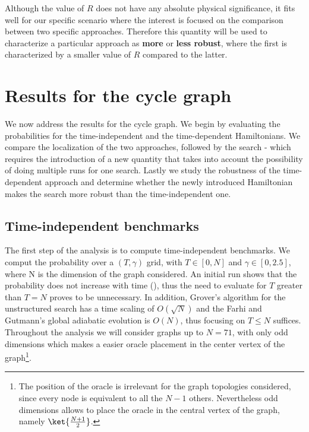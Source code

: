         Although the value of $R$ does not have any absolute physical significance, it fits well for our specific scenario where the interest is focused on the comparison between two specific approaches. Therefore this quantity will be used to characterize a particular approach as \textbf{more} or \textbf{less robust}, where the first is characterized by a smaller value of $R$ compared to the latter.

\clearpage
\section{Results for the cycle graph}
We now address the results for the cycle graph. We begin by evaluating the probabilities for the time-independent and the time-dependent Hamiltonians. We compare the localization of the two approaches, followed by the search - which requires the introduction of a new quantity that takes into account the possibility of doing multiple runs for one search. Lastly we study the robustness of the time-dependent approach and determine whether the newly introduced Hamiltonian makes the search more robust than the time-independent one.
    \subsection{Time-independent benchmarks}
        The first step of the analysis is to compute time-independent benchmarks. We comput the probability over a $(T,\gamma)$ grid, with $T\in[0,N]$ and $\gamma\in[0,2.5]$, where N is the dimension of the graph considered. An initial run shows that the probability does not increase with time (), thus the need to evaluate for $T$ greater than $T=N$ proves to be unnecessary. In addition, Grover's algorithm for the unstructured search has a time scaling of $O(\sqrt{N})$ and the Farhi and Gutmann's global adiabatic evolution is $O(N)$, thus focusing on $T \leq N$ suffices.\\
        

        \clearpage
        \noindent
        Throughout the analysis we will consider graphs up to $N = 71$, with only odd dimensions which makes a easier oracle placement in the center vertex of the graph\footnote{The position of the oracle is irrelevant for the graph topologies considered, since every node is equivalent to all the $N-1$ others. Nevertheless odd dimensions allows to place the oracle in the central vertex of the graph, namely $\ket{\frac{N+1}{2}}$.}. \\

